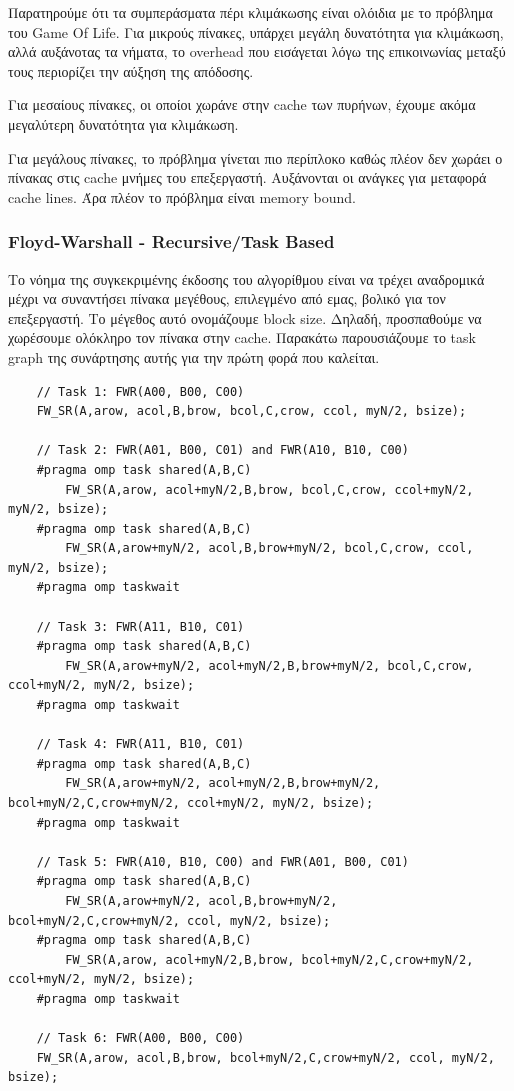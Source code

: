 \documentclass[../final_report.tex]{subfiles}
\begin{document}
Παρατηρούμε ότι τα συμπεράσματα πέρι κλιμάκωσης είναι ολόιδια με το πρόβλημα του Game Of Life.
Για μικρούς πίνακες, υπάρχει μεγάλη δυνατότητα για κλιμάκωση, αλλά αυξάνοτας τα νήματα, το overhead
που εισάγεται λόγω της επικοινωνίας μεταξύ τους περιορίζει την αύξηση της απόδοσης.

Για μεσαίους πίνακες, οι οποίοι χωράνε στην cache των πυρήνων, έχουμε ακόμα μεγαλύτερη δυνατότητα για κλιμάκωση.

Για μεγάλους πίνακες, το πρόβλημα γίνεται πιο περίπλοκο καθώς πλέον δεν χωράει ο πίνακας στις cache μνήμες του επεξεργαστή.
Αυξάνονται οι ανάγκες για μεταφορά cache lines. Άρα πλέον το πρόβλημα είναι memory bound. 

\subsubsection{Floyd-Warshall - Recursive/Task Based}

Το νόημα της συγκεκριμένης έκδοσης του αλγορίθμου είναι να τρέχει αναδρομικά μέχρι να συναντήσει πίνακα
μεγέθους, επιλεγμένο από εμας, βολικό για τον επεξεργαστή. Το μέγεθος αυτό ονομάζουμε block size. Δηλαδή, προσπαθούμε να χωρέσουμε ολόκληρο τον
πίνακα στην cache. Παρακάτω παρουσιάζουμε το task graph της συνάρτησης αυτής για την πρώτη φορά που καλείται.

\begin{lstlisting}
    // Task 1: FWR(A00, B00, C00)
    FW_SR(A,arow, acol,B,brow, bcol,C,crow, ccol, myN/2, bsize);
    
    // Task 2: FWR(A01, B00, C01) and FWR(A10, B10, C00)
    #pragma omp task shared(A,B,C)
        FW_SR(A,arow, acol+myN/2,B,brow, bcol,C,crow, ccol+myN/2, myN/2, bsize);
    #pragma omp task shared(A,B,C)
        FW_SR(A,arow+myN/2, acol,B,brow+myN/2, bcol,C,crow, ccol, myN/2, bsize);
    #pragma omp taskwait
    
    // Task 3: FWR(A11, B10, C01)
    #pragma omp task shared(A,B,C)
        FW_SR(A,arow+myN/2, acol+myN/2,B,brow+myN/2, bcol,C,crow, ccol+myN/2, myN/2, bsize);
    #pragma omp taskwait

    // Task 4: FWR(A11, B10, C01)
    #pragma omp task shared(A,B,C)
        FW_SR(A,arow+myN/2, acol+myN/2,B,brow+myN/2, bcol+myN/2,C,crow+myN/2, ccol+myN/2, myN/2, bsize);
    #pragma omp taskwait

    // Task 5: FWR(A10, B10, C00) and FWR(A01, B00, C01)
    #pragma omp task shared(A,B,C)
        FW_SR(A,arow+myN/2, acol,B,brow+myN/2, bcol+myN/2,C,crow+myN/2, ccol, myN/2, bsize);
    #pragma omp task shared(A,B,C)	
        FW_SR(A,arow, acol+myN/2,B,brow, bcol+myN/2,C,crow+myN/2, ccol+myN/2, myN/2, bsize);
    #pragma omp taskwait

    // Task 6: FWR(A00, B00, C00)
    FW_SR(A,arow, acol,B,brow, bcol+myN/2,C,crow+myN/2, ccol, myN/2, bsize);
\end{lstlisting}
\end{document}
